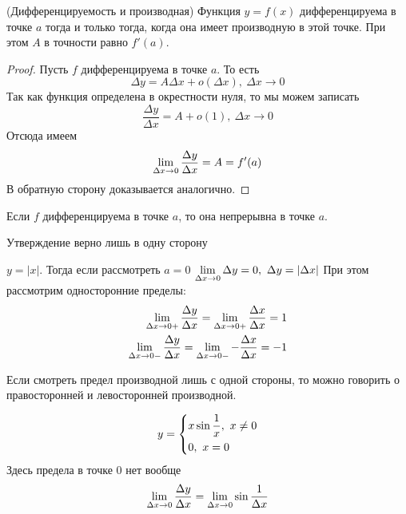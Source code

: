 \begin{theorem}
	(Дифференцируемость и производная) Функция $y = f(x)$ дифференцируема в точке $a$ тогда и только тогда, когда она имеет производную в этой точке. При этом $A$ в точности равно $f'(a)$.
\end{theorem}

\begin{proof}
	Пусть $f$ дифференцируема в точке $a$. То есть
	$$
		\Delta y = A \Delta x + o(\Delta x),\ \Delta x \to 0
	$$
	Так как функция определена в окрестности нуля, то мы можем записать
	$$
		\frac{\Delta y}{\Delta x} = A + o(1),\ \Delta x \to 0
	$$
	Отсюда имеем
	$$
		\lim\limits_{\Delta x \to 0} \frac{\Delta y}{\Delta x} = A = f'(a)
	$$
	В обратную сторону доказывается аналогично.
\end{proof}

\begin{corollary}
	Если $f$ дифференцируема в точке $a$, то она непрерывна в точке $a$.
\end{corollary}

\begin{note}
	Утверждение верно лишь в одну сторону
\end{note}

\begin{example}
	$y = |x|$. Тогда если рассмотреть $a = 0$
	$\lim\limits_{\Delta x \to 0} \Delta y = 0,\ \Delta y = |\Delta x|$
	При этом рассмотрим односторонние пределы:
	\begin{align*}
		\lim\limits_{\Delta x \to 0+} \frac{\Delta y}{\Delta x} = \lim\limits_{\Delta x \to 0+} \frac{\Delta x}{\Delta x} = 1
		\\
		\lim\limits_{\Delta x \to 0-} \frac{\Delta y}{\Delta x} = \lim\limits_{\Delta x \to 0-} -\frac{\Delta x}{\Delta x} = -1
	\end{align*}
\end{example}

\begin{note}
	Если смотреть предел производной лишь с одной стороны, то можно говорить о правосторонней и левосторонней производной.
\end{note}

\begin{example}
	\[
		y = \left\{\begin{aligned}&{x \sin \frac{1}{x},\ x \neq 0} \\ &{0,\ x = 0}\end{aligned}\right.
	\]
	Здесь предела в точке 0 нет вообще
	\[
		\lim\limits_{\Delta x \to 0} \frac{\Delta y}{\Delta x} = \lim\limits_{\Delta x \to 0} \sin \frac{1}{\Delta x}
	\]
\end{example}

